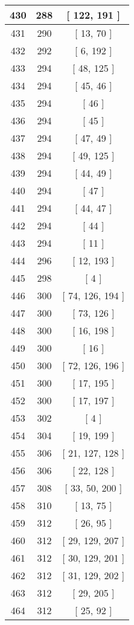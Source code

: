 \begin{center}
\begin{longtable}[H]{|| c c c ||}
\hline
430 & 288 & [ 122, 191 ] \\ 
\hline
431 & 290 & [ 13, 70 ] \\ 
\hline
432 & 292 & [ 6, 192 ] \\ 
\hline
433 & 294 & [ 48, 125 ] \\ 
\hline
434 & 294 & [ 45, 46 ] \\ 
\hline
435 & 294 & [ 46 ] \\ 
\hline
436 & 294 & [ 45 ] \\ 
\hline
437 & 294 & [ 47, 49 ] \\ 
\hline
438 & 294 & [ 49, 125 ] \\ 
\hline
439 & 294 & [ 44, 49 ] \\ 
\hline
440 & 294 & [ 47 ] \\ 
\hline
441 & 294 & [ 44, 47 ] \\ 
\hline
442 & 294 & [ 44 ] \\ 
\hline
443 & 294 & [ 11 ] \\ 
\hline
444 & 296 & [ 12, 193 ] \\ 
\hline
445 & 298 & [ 4 ] \\ 
\hline
446 & 300 & [ 74, 126, 194 ] \\ 
\hline
447 & 300 & [ 73, 126 ] \\ 
\hline
448 & 300 & [ 16, 198 ] \\ 
\hline
449 & 300 & [ 16 ] \\ 
\hline
450 & 300 & [ 72, 126, 196 ] \\ 
\hline
451 & 300 & [ 17, 195 ] \\ 
\hline
452 & 300 & [ 17, 197 ] \\ 
\hline
453 & 302 & [ 4 ] \\ 
\hline
454 & 304 & [ 19, 199 ] \\ 
\hline
455 & 306 & [ 21, 127, 128 ] \\ 
\hline
456 & 306 & [ 22, 128 ] \\ 
\hline
457 & 308 & [ 33, 50, 200 ] \\ 
\hline
458 & 310 & [ 13, 75 ] \\ 
\hline
459 & 312 & [ 26, 95 ] \\ 
\hline
460 & 312 & [ 29, 129, 207 ] \\ 
\hline
461 & 312 & [ 30, 129, 201 ] \\ 
\hline
462 & 312 & [ 31, 129, 202 ] \\ 
\hline
463 & 312 & [ 29, 205 ] \\ 
\hline
464 & 312 & [ 25, 92 ] \\ 

\end{longtable}
\end{center}
